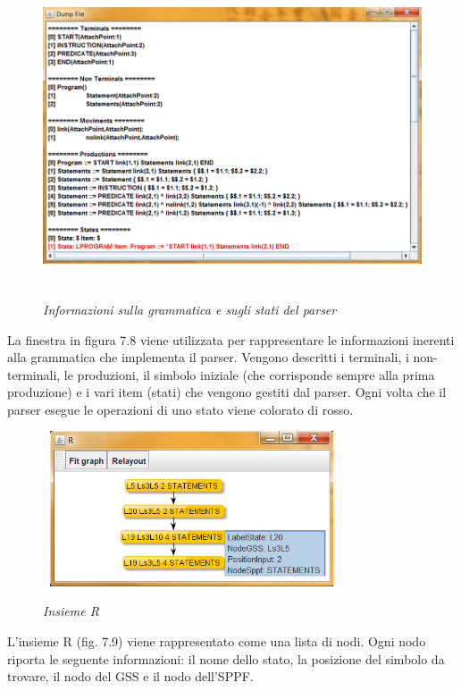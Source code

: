 \begin{figure}[hbpb]\label{DumpFile}
	\centering
	{\includegraphics[height=250pt,width=330pt,scale=0.1]{files/DumpFile.png}}
	\caption{\textit{Informazioni sulla grammatica e sugli stati del parser}}
\end{figure}
\noindent La finestra in figura 7.8 viene utilizzata per rappresentare le informazioni inerenti alla grammatica che implementa il parser. Vengono descritti i terminali, i non-terminali, le produzioni, il simbolo iniziale (che corrisponde sempre alla prima produzione) e i vari item (stati) che vengono gestiti dal parser. Ogni volta che il parser esegue le operazioni di uno stato viene colorato di rosso.\par 
\begin{figure}[hbpb]\label{InsiemeR}
	\centering
	{\includegraphics[height=130pt,width=250pt,scale=0.1]{files/InsiemeR.png}}
	\caption{\textit{Insieme R}}
\end{figure}
\noindent L'insieme R (fig. 7.9) viene rappresentato come una lista di nodi. Ogni nodo riporta le seguente informazioni: il nome dello stato, la posizione del simbolo da trovare, il nodo del GSS e il nodo dell'SPPF.